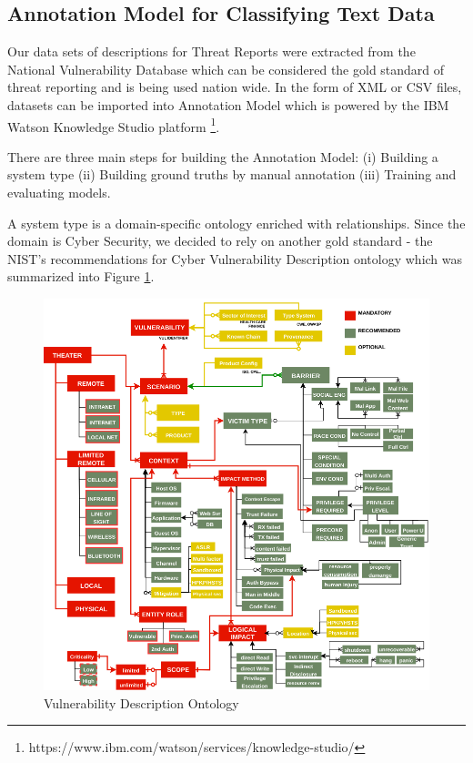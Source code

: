 \documentclass{article} %
\begin{document}
\subsection{Annotation Model for Classifying Text Data}
Our data sets of descriptions for Threat Reports were extracted from the National Vulnerability Database which can be considered the gold standard of threat reporting and is being used nation wide. In the form of XML or CSV files, datasets can be imported into Annotation Model which is powered by the IBM Watson Knowledge Studio platform \footnote{https://www.ibm.com/watson/services/knowledge-studio/}.

There are three main steps for building the Annotation Model: (i) Building a system type (ii) Building ground truths by manual annotation (iii) Training and evaluating models.

A system type is a domain-specific ontology enriched with relationships. Since the domain is Cyber Security, we decided to rely on another gold standard - the NIST's recommendations for Cyber Vulnerability Description ontology \cite{Booth2016DraftOntology} which was summarized into Figure \ref{Figure:VulOntology}.

\begin{figure}[h]
  \centering
  \includegraphics[width=12cm]{images/NISTIR8138.png}
  \caption{Vulnerability Description Ontology}
  \label{Figure:VulOntology}
\end{figure}
\end{document}
